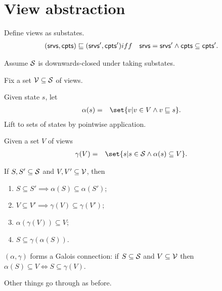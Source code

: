
\section{View abstraction}

Define views as substates.
\begin{eqnarray*}
(\srv, \cpt ) \sqle (\srv', \cpt') & iff & 
  \srv = \srv' \land \cpt \subseteq \cpt' .
\end{eqnarray*}

Assume $\S$ is downwards-closed under taking substates. 

Fix a set $\V \subseteq \S$ of views.

Given state $s$, let
%
\begin{eqnarray*}
\alpha(s) & = &
  \set{ v | v \in V \land v \sqle s}.
\end{eqnarray*}
%
Lift to sets of states by pointwise application. 

Given a set $V$ of views
\begin{eqnarray*}
\gamma(V) & = &   \set{ s | s \in \S \land \alpha(s) \subseteq V }.
\end{eqnarray*}



\begin{lemma}
If $S, S' \subseteq \S$ and $V, V' \subseteq \V$, then
\begin{enumerate}
\item $S \subseteq S' \implies \alpha(S) \subseteq \alpha(S')$;

\item $V \subseteq V' \implies \gamma(V) \subseteq \gamma(V')$;

\item $\alpha(\gamma(V)) \subseteq V$;

\item $S \subseteq \gamma(\alpha(S))$.
\end{enumerate}
\end{lemma}
%



\begin{lemma}
$(\alpha, \gamma)$ forms a Galois connection: if $S \subseteq \S$ and $V
  \subseteq \V$ then $\alpha(S) \subseteq V \iff S \subseteq \gamma(V)$.
\end{lemma}
%



Other things go through as before.  
